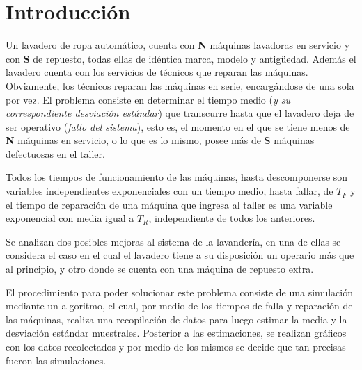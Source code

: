\section{\textbf{Introducción}}

	\par Un lavadero de ropa automático, cuenta con \textbf{N} máquinas lavadoras en servicio y con \textbf{S} de
	repuesto, todas ellas de idéntica marca, modelo y antigüedad. Además el lavadero cuenta con los servicios de técnicos
	que reparan las máquinas. Obviamente, los técnicos reparan las máquinas en serie, encargándose de una sola por
	vez. El problema consiste en determinar el tiempo medio (\textit{y su correspondiente desviación estándar}) que
	transcurre hasta que el lavadero deja de ser operativo (\textit{fallo del sistema}), esto es, el momento en el que se
	tiene menos de \textbf{N} máquinas en servicio, o lo que es lo mismo, posee más de \textbf{S} máquinas defectuosas en
	el taller.

	\par Todos los tiempos de funcionamiento de las máquinas, hasta descomponerse son variables independientes
	exponenciales con un tiempo medio, hasta fallar, de \textbf{$T_{F}$} y el tiempo de reparación de una máquina que
	ingresa al taller es una variable exponencial con media igual a \textbf{$T_{R}$}, independiente de todos los
	anteriores.

	\par Se analizan dos posibles mejoras al sistema de la lavandería, en una de ellas se considera el caso en el cual el
	lavadero tiene a su disposición un operario más que al principio, y otro donde se cuenta con una máquina de repuesto
	extra.

	\par El procedimiento para poder solucionar este problema consiste de una simulación mediante un algoritmo, el cual,
	por medio de los tiempos de falla y reparación de las máquinas, realiza una recopilación de datos para luego estimar
	la media y la desviación estándar muestrales. Posterior a las estimaciones, se realizan gráficos con los datos
	recolectados y por medio de los mismos se decide que tan precisas fueron las simulaciones.
